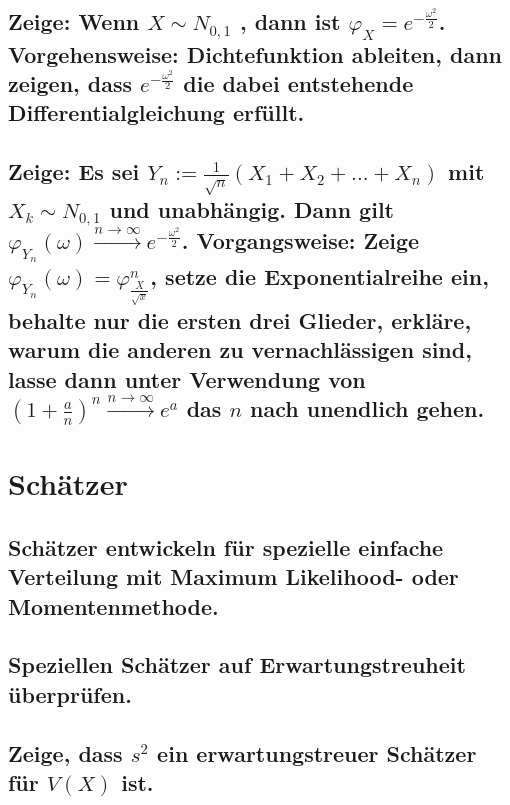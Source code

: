 \documentclass[a4paper,10pt]{article}
\begin{document}
\subsection{Zeige: Wenn $X \sim N_{0,1}$ , dann ist $\varphi_X = e^{- \frac{\omega^2}{2}}$. Vorgehensweise: Dichtefunktion ableiten, dann zeigen, dass $e^{- \frac{\omega^2}{2}}$ die dabei entstehende Differentialgleichung erfüllt.}

\subsection{Zeige: Es sei $Y_n:= \frac{1}{\sqrt{n}} (X_1 + X_2 + . . . + X_n)$ mit $X_k \sim N_{0,1}$ und unabhängig. Dann gilt $\varphi_{Y_{n}}(\omega)\xrightarrow{n\rightarrow \infty} e^{- \frac{\omega^2}{2}}$. Vorgangsweise: Zeige $\varphi_{Y_{n}}(\omega) = \varphi^{n}_{\frac{X}{\sqrt{x}}}$, setze die Exponentialreihe ein, behalte nur die ersten drei Glieder, erkläre, warum die anderen zu vernachlässigen sind, lasse dann unter Verwendung von $(1 + \frac{a}{n})^n \xrightarrow{n\rightarrow \infty} e^a$ das $n$ nach unendlich gehen.}

\newpage
\section{Schätzer}
\subsection{Schätz\-er ent\-wick\-eln für spe\-ziel\-le ein\-fache Ver\-teil\-ung mit Maximum Likeli\-hood- oder Momenten\-methode.}

\subsection{Speziellen Schätzer auf Erwartungs\-treuheit überprüfen.}

\subsection{Zeige, dass $s^2$ ein erwartungstreuer Schätzer für $V(X)$ ist.}

\newpage
\end{document}
